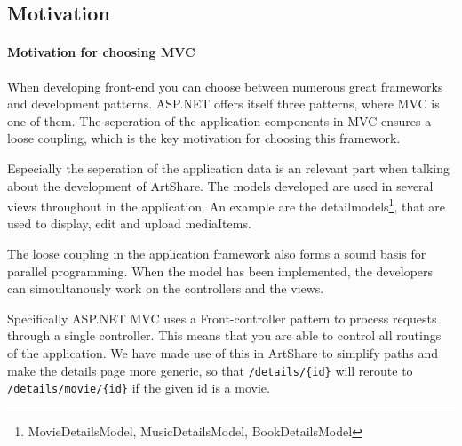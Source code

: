 \documentclass[../report.tex]{subfiles}
\begin{document}



\subsection{Motivation}

\paragraph{Motivation for choosing MVC}
When developing front-end you can choose between numerous great frameworks and development patterns. ASP.NET offers itself three patterns, where MVC is one of them. The seperation of the application components in MVC ensures a loose coupling, which is the key motivation for choosing this framework.

Especially the seperation of the application data is an relevant part when talking about the development of ArtShare. The models developed are used in several views throughout in the application. An example are the detailmodels\footnote{MovieDetailsModel, MusicDetailsModel, BookDetailsModel}, that are used to display, edit and upload mediaItems.

The loose coupling in the application framework also forms a sound basis for parallel programming. When the model has been implemented, the developers can simoultanously work on the controllers and the views.

Specifically ASP.NET MVC uses a Front-controller pattern to process requests through a single controller. This means that you are able to control all routings of the application. We have made use of this in ArtShare to simplify paths and make the details page more generic, so that \texttt{/details/\{id\}} will reroute to \texttt{/details/movie/\{id\}} if the given id is a movie.
\end{document}
